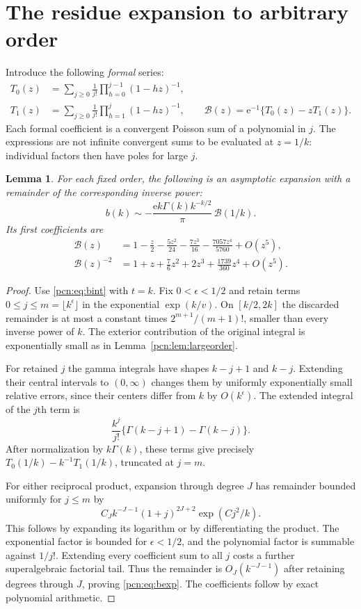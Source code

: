 \documentclass[11pt,letterpaper]{article}
\newtheorem{lemma}[theorem]{Lemma}
\theoremstyle{remark}\newtheorem{remark}[theorem]{Remark}
\newcommand{\ee}{\mathrm e}
\begin{document}
\section{The residue expansion to arbitrary order}
Introduce the following \emph{formal} series:
\begin{align}
 T_0(z)&=\sum_{j\ge0}\frac1{j!}\prod_{h=0}^{j-1}(1-hz)^{-1},\label{pcn:eq:T0}\\
 T_1(z)&=\sum_{j\ge0}\frac1{j!}\prod_{h=1}^{j}(1-hz)^{-1},\qquad
 \mathcal B(z)=\ee^{-1}\{T_0(z)-zT_1(z)\}.\label{pcn:eq:Bformal}
\end{align}
Each formal coefficient is a convergent Poisson sum of a polynomial in $j$. The expressions are not infinite convergent sums to be evaluated at $z=1/k$: individual factors then have poles for large $j$.

\begin{lemma}\label{pcn:lem:bexp}
For each fixed order, the following is an asymptotic expansion with a remainder of the corresponding inverse power:
\begin{equation}\label{pcn:eq:bexp}
 b(k)\sim-\frac{\ee k\Gamma(k)k^{-k/2}}\pi\,\mathcal B(1/k).
\end{equation}
Its first coefficients are
\begin{align}
 \mathcal B(z)&=1-\frac z2-\frac{5z^2}{24}-\frac{7z^3}{16}
                    -\frac{7057z^4}{5760}+O(z^5),\label{pcn:eq:Bcoeff}\\
 \mathcal B(z)^{-2}&=1+z+\frac76z^2+2z^3+\frac{1739}{360}z^4+O(z^5).
\end{align}
\end{lemma}
\begin{proof}
Use \eqref{pcn:eq:bint} with $t=k$. Fix $0<\epsilon<1/2$ and retain terms $0\le j\le m=\lfloor k^\epsilon\rfloor$ in the exponential $\exp(k/v)$. On $[k/2,2k]$ the discarded remainder is at most a constant times $2^{m+1}/(m+1)!$, smaller than every inverse power of $k$. The exterior contribution of the original integral is exponentially small as in Lemma~\ref{pcn:lem:largeorder}.

For retained $j$ the gamma integrals have shapes $k-j+1$ and $k-j$. Extending their central intervals to $(0,\infty)$ changes them by uniformly exponentially small relative errors, since their centers differ from $k$ by $O(k^\epsilon)$. The extended integral of the $j$th term is
\[
 \frac{k^j}{j!}\bigl\{\Gamma(k-j+1)-\Gamma(k-j)\bigr\}.
\]
After normalization by $k\Gamma(k)$, these terms give precisely $T_0(1/k)-k^{-1}T_1(1/k)$, truncated at $j=m$.

For either reciprocal product, expansion through degree $J$ has remainder bounded uniformly for $j\le m$ by
\[
 C_J k^{-J-1}(1+j)^{2J+2}\exp(Cj^2/k).
\]
This follows by expanding its logarithm or by differentiating the product. The exponential factor is bounded for $\epsilon<1/2$, and the polynomial factor is summable against $1/j!$. Extending every coefficient sum to all $j$ costs a further superalgebraic factorial tail. Thus the remainder is $O_J(k^{-J-1})$ after retaining degrees through $J$, proving \eqref{pcn:eq:bexp}. The coefficients follow by exact polynomial arithmetic.
\end{proof}
\end{document}
